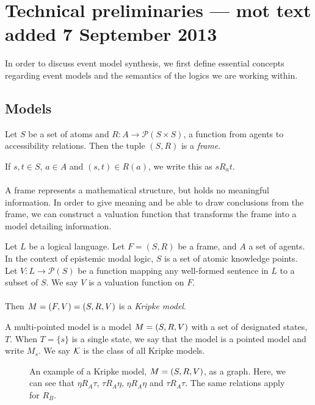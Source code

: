 \section{Technical preliminaries --- mot text added 7 September 2013} \label{chapter:prelim}
In order to discuss event model synthesis, we first define essential concepts regarding event
models and the semantics of the logics we are working within.

\subsection{Models}

\begin{defn} \label{frame}
	Let $S$ be a set of atoms and $R: A \to \mathcal{P}(S \times S)$, a function from agents to
	accessibility relations.
	Then the tuple $(S, R)$ is a {\em frame}.
\end{defn}

If $s, t \in S$, $a \in A$ and $(s,t) \in R(a)$, we write this as $s R_a t$.\\
\\
A frame represents a mathematical structure, but holds no meaningful information.
In order to give meaning and be able to draw conclusions from the frame, we can
construct a valuation function that transforms the frame into a model detailing
information.

\begin{defn} \label{model}
	Let $L$ be a logical language.
	Let $F = (S, R)$ be a frame, and $A$ a set of agents.
	In the context of epistemic modal logic, $S$ is a set of atomic knowledge points.
	Let $V: L \to \mathcal{P}(S)$ be a function mapping any
	well-formed	sentence in $L$ to a subset of $S$.
	We say $V$ is a valuation function on $F$.\\
	\\
	Then $M = (F, V) = (S, R, V)$ is a {\em Kripke model}.
\end{defn}

A multi-pointed model is a model $M = (S, R, V)$ with a set of designated states, $T$.
When $T = \{s\}$ is a single state, we say that the model is a pointed model and write $M_s$.
We say $\mathcal{K}$ is the class of all Kripke models.

\begin{figure}
\centering
{}
\caption{An example of a Kripke model, $M = (S,R,V)$, as a graph. Here, we can see that
$\eta R_A \tau$, $\tau R_A \eta$, $\eta R_A \eta$ and $\tau R_A \tau$. The same relations apply for
$R_B$.}
\label{figure:exampleModel}
\end{figure}

